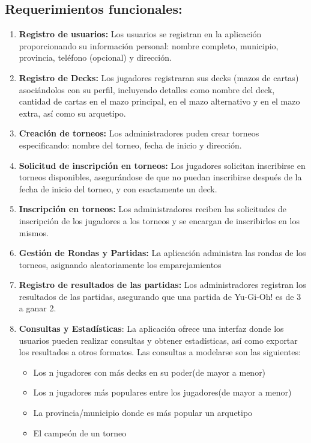 \documentclass[a4paper]{article}
\begin{document}
\subsection{Requerimientos funcionales:}
\begin{enumerate}
	\item \textbf{Registro de usuarios:} Los usuarios se registran en la aplicación proporcionando su información personal: nombre completo, municipio, provincia, teléfono (opcional) y dirección.
	\item \textbf{Registro de Decks:} Los jugadores registraran sus decks (mazos de cartas) asoci\'andolos con su perfil, incluyendo detalles como nombre del deck, cantidad de cartas en el mazo principal, en el mazo alternativo y en el mazo extra, así como su arquetipo.
	\item \textbf{Creaci\'on de torneos:} Los administradores puden crear torneos especificando: nombre del torneo, fecha de inicio y dirección.
	\item \textbf{Solicitud de inscripci\'on en torneos:} Los jugadores solicitan inscribirse en torneos disponibles, asegur\'andose de que no puedan inscribirse despu\'es de la fecha de inicio del torneo, y con esactamente un deck. 
	\item \textbf{Inscripci\'on en torneos:} Los administradores reciben las solicitudes de inscripci\'on de los jugadores a los torneos y se encargan de inscribirlos en los mismos.
    \item \textbf{Gestión de Rondas y Partidas:} La aplicaci\'on administra las rondas de los torneos, asignando aleatoriamente los emparejamientos
    \item \textbf{Registro de resultados de las partidas:} Los administradores registran los resultados de las partidas, asegurando que una partida de Yu-Gi-Oh! es de 3 a ganar 2.
    \item \textbf{Consultas y Estad\'isticas}: La aplicaci\'on ofrece una interfaz donde los usuarios pueden realizar consultas y obtener estad\'isticas, as\'i como exportar los resultados a otros formatos. Las consultas a modelarse son las siguientes:
    \begin{itemize}
    \item Los n jugadores con m\'as decks en su poder(de mayor a menor) 
    \item Los n jugadores m\'as populares entre los jugadores(de mayor a menor)
    \item La provincia/municipio donde es m\'as popular un arquetipo
    \item El campe\'on de un torneo

\end{itemize}
\end{enumerate}
\end{document}

